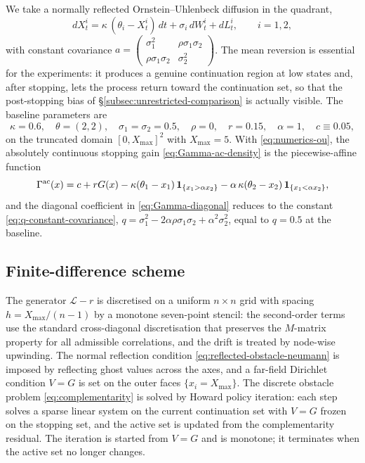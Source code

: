 \documentclass[pdflatex,sn-mathphys-num]{sn-jnl}
\theoremstyle{plain}
\theoremstyle{definition}
\theoremstyle{remark}
\numberwithin{equation}{section}
\begin{document}
We take a normally reflected Ornstein--Uhlenbeck diffusion in the quadrant,
\begin{equation}
\label{eq:numerics-ou}
dX_t^i = \kappa\,(\theta_i - X_t^i)\,dt + \sigma_i\, dW_t^i + dL_t^i,
\qquad i=1,2,
\end{equation}
with constant covariance
$a=\left(\begin{smallmatrix}\sigma_1^2 & \rho\sigma_1\sigma_2\\
\rho\sigma_1\sigma_2 & \sigma_2^2\end{smallmatrix}\right)$.
The mean reversion is essential for the experiments: it produces a genuine
continuation region at low states and, after stopping, lets the process return
toward the continuation set, so that the post-stopping bias of
\S\ref{subsec:unrestricted-comparison} is actually visible. The baseline
parameters are
\begin{equation}
\label{eq:numerics-baseline}
\kappa=0.6,\quad \theta=(2,2),\quad \sigma_1=\sigma_2=0.5,\quad \rho=0,\quad
r=0.15,\quad \alpha=1,\quad c\equiv 0.05,
\end{equation}
on the truncated domain $[0,X_{\max}]^2$ with $X_{\max}=5$. With
\eqref{eq:numerics-ou}, the absolutely continuous stopping gain
\eqref{eq:Gamma-ac-density} is the piecewise-affine function
\[
\Gamma^{\rm ac}(x)= c + rG(x)
- \kappa(\theta_1-x_1)\,\mathbf 1_{\{x_1>\alpha x_2\}}
- \alpha\,\kappa(\theta_2-x_2)\,\mathbf 1_{\{x_1<\alpha x_2\}},
\]
and the diagonal coefficient in \eqref{eq:Gamma-diagonal} reduces to the
constant \eqref{eq:q-constant-covariance},
$q=\sigma_1^2-2\alpha\rho\sigma_1\sigma_2+\alpha^2\sigma_2^2$, equal to
$q=0.5$ at the baseline.

\subsection{Finite-difference scheme}
\label{subsec:numerics-fd}

The generator $\mathcal L-r$ is discretised on a uniform $n\times n$ grid with
spacing $h=X_{\max}/(n-1)$ by a monotone seven-point stencil: the second-order
terms use the standard cross-diagonal discretisation that preserves the
$M$-matrix property for all admissible correlations, and the drift is treated by
node-wise upwinding. The normal reflection condition
\eqref{eq:reflected-obstacle-neumann} is imposed by reflecting ghost values across
the axes, and a far-field Dirichlet condition $V=G$ is set on the outer faces
$\{x_i=X_{\max}\}$. The discrete obstacle problem
\eqref{eq:complementarity} is solved by Howard policy iteration: each step solves
a sparse linear system on the current continuation set with $V=G$ frozen on the
stopping set, and the active set is updated from the complementarity residual.
The iteration is started from $V=G$ and is monotone; it terminates when the
active set no longer changes.
\end{document}
